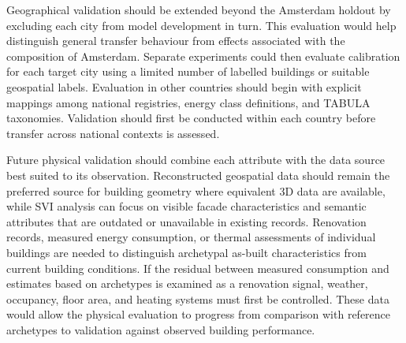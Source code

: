 Geographical validation should be extended beyond the Amsterdam holdout by excluding each city from model development in turn.
This evaluation would help distinguish general transfer behaviour from effects associated with the composition of Amsterdam.
Separate experiments could then evaluate calibration for each target city using a limited number of labelled buildings or suitable geospatial labels.
Evaluation in other countries should begin with explicit mappings among national registries, energy class definitions, and TABULA taxonomies.
Validation should first be conducted within each country before transfer across national contexts is assessed.

Future physical validation should combine each attribute with the data source best suited to its observation.
Reconstructed geospatial data should remain the preferred source for building geometry where equivalent 3D data are available, while \ac{SVI} analysis can focus on visible facade characteristics and semantic attributes that are outdated or unavailable in existing records.
Renovation records, measured energy consumption, or thermal assessments of individual buildings are needed to distinguish archetypal as-built characteristics from current building conditions.
If the residual between measured consumption and estimates based on archetypes is examined as a renovation signal, weather, occupancy, floor area, and heating systems must first be controlled.
These data would allow the physical evaluation to progress from comparison with reference archetypes to validation against observed building performance.
